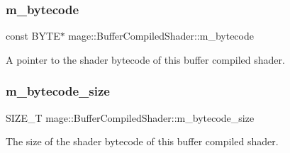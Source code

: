 \subsubsection{\texorpdfstring{m\+\_\+bytecode}{m\_bytecode}}
{\footnotesize\ttfamily const B\+Y\+TE$\ast$ mage\+::\+Buffer\+Compiled\+Shader\+::m\+\_\+bytecode\hspace{0.3cm}{\ttfamily [private]}}

A pointer to the shader bytecode of this buffer compiled shader. \hypertarget{classmage_1_1_buffer_compiled_shader_a16839a71dbb2092793f4fba1a6cfe29e}{}\label{classmage_1_1_buffer_compiled_shader_a16839a71dbb2092793f4fba1a6cfe29e} 
\subsubsection{\texorpdfstring{m\+\_\+bytecode\+\_\+size}{m\_bytecode\_size}}
{\footnotesize\ttfamily S\+I\+Z\+E\+\_\+T mage\+::\+Buffer\+Compiled\+Shader\+::m\+\_\+bytecode\+\_\+size\hspace{0.3cm}{\ttfamily [private]}}

The size of the shader bytecode of this buffer compiled shader. 